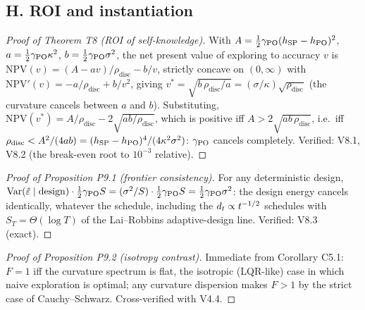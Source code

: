 \documentclass[11pt]{article}
\begin{document}
\subsection*{H. ROI and instantiation}

\begin{proof}[Proof of Theorem T8 (ROI of self-knowledge)]
With $A = \tfrac{1}{2}\gamma_{\mathrm{PO}}(h_{\mathrm{SP}} - h_{\mathrm{PO}})^2$, $a = \tfrac{1}{2}\gamma_{\mathrm{PO}}\kappa^2$,
$b = \tfrac{1}{2}\gamma_{\mathrm{PO}}\sigma^2$, the net present value of exploring to
accuracy $v$ is $\mathrm{NPV}(v) = (A - a v)/\rho_{\mathrm{disc}} - b/v$,
strictly concave on $(0,\infty)$ with
$\mathrm{NPV}'(v) = -a/\rho_{\mathrm{disc}} + b/v^2$, giving
$v^* = \sqrt{b\,\rho_{\mathrm{disc}}/a} =
(\sigma/\kappa)\sqrt{\rho_{\mathrm{disc}}}$ (the curvature cancels between
$a$ and $b$). Substituting, $\mathrm{NPV}(v^*) = A/\rho_{\mathrm{disc}} -
2\sqrt{ab/\rho_{\mathrm{disc}}}$, which is positive iff
$A > 2\sqrt{a b\,\rho_{\mathrm{disc}}}$, i.e.\ iff
$\rho_{\mathrm{disc}} < A^2/(4ab) = (h_{\mathrm{SP}} - h_{\mathrm{PO}})^4/(4\kappa^2\sigma^2)$:
$\gamma_{\mathrm{PO}}$ cancels completely. Verified: V8.1, V8.2 (the break-even root to
$10^{-3}$ relative).
\end{proof}

\begin{proof}[Proof of Proposition P9.1 (frontier consistency)]
For any deterministic design, $\operatorname{Var}(\hat{\varepsilon}\mid\mathrm{design}) \cdot
\tfrac{1}{2}\gamma_{\mathrm{PO}} S = (\sigma^2/S)\cdot\tfrac{1}{2}\gamma_{\mathrm{PO}} S =
\tfrac{1}{2}\gamma_{\mathrm{PO}}\sigma^2$: the design energy cancels identically, whatever
the schedule, including the $d_t \propto t^{-1/2}$ schedules with
$S_T = \Theta(\log T)$ of the Lai--Robbins adaptive-design line. Verified:
V8.3 (exact).
\end{proof}

\begin{proof}[Proof of Proposition P9.2 (isotropy contrast)]
Immediate from Corollary C5.1: $F = 1$ iff the curvature spectrum is flat,
the isotropic (LQR-like) case in which naive exploration is optimal;
any curvature dispersion makes $F > 1$ by the strict case of
Cauchy--Schwarz. Cross-verified with V4.4.
\end{proof}
\end{document}
